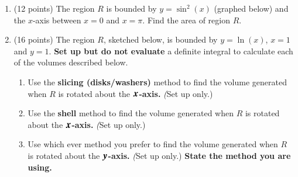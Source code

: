 \documentclass[12pt]{article}
\begin{document}
\newpage
\begin{enumerate}
\item (12 points) The region $R$  is bounded by $y=\sin^2(x)$ (graphed below) and the $x$-axis between $x=0$ and $x=\pi.$ Find the area of region $R.$\\
\newpage
\item (16 points) The region $R$, sketched below, is bounded by $y=\ln(x)$, $x=1$ and $y=1$. \textbf{Set up but do not evaluate} a definite integral to calculate each of the volumes described below. \\
	\begin{enumerate}
	\item Use the \textbf{slicing (disks/washers)} method to find the volume generated when $R$ is rotated about the \textbf{${\large{\boldsymbol{x}}}$-axis.} \textit(Set up only.)
	\vfill
	\item Use the \textbf{shell} method to find the volume generated when $R$ is rotated about the \textbf{${\large{\boldsymbol{x}}}$-axis.} \textit(Set up only.)
	\vfill
	\item Use which ever method you prefer to find the volume generated when $R$ is rotated about the \textbf{${\large{\boldsymbol{y}}}$-axis.} \textit(Set up only.) \textbf{State the method you are using.}
	\vfill
	\end{enumerate}
\newpage	


\end{enumerate}
\end{document}
